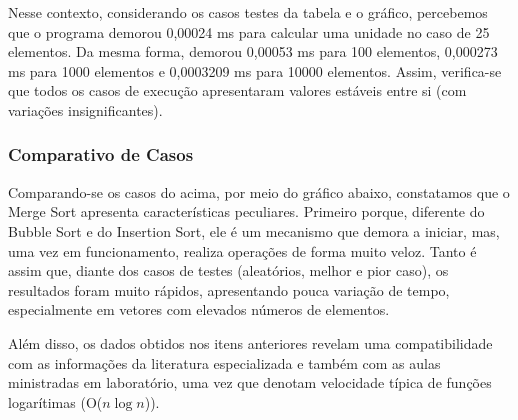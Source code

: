 \documentclass[a4paper, 12pt]{article}
\begin{document}
\vspace{0.8cm}
Nesse contexto, considerando os casos testes da tabela e o gráfico, percebemos que o programa demorou 0,00024 ms para calcular uma unidade no caso de 25 elementos. Da mesma forma, demorou 0,00053 ms para 100 elementos, 0,000273 ms para 1000 elementos e 0,0003209 ms para 10000 elementos. Assim, verifica-se que todos os casos de execução apresentaram valores estáveis entre si (com variações insignificantes).


\subsubsection{Comparativo de Casos}

\tab{ }Comparando-se os casos do acima, por meio do gráfico abaixo, constatamos que o Merge Sort apresenta características peculiares. Primeiro porque, diferente do Bubble Sort e do Insertion Sort, ele é um mecanismo que demora a iniciar, mas, uma vez em funcionamento, realiza operações de forma muito veloz. Tanto é assim que, diante dos casos de testes (aleatórios, melhor e pior caso), os resultados foram muito rápidos, apresentando pouca variação de tempo, especialmente em vetores com elevados números de elementos.

\begin{center}
\end{center}
\vspace{0.4cm}
\tab{ }Além disso, os dados obtidos nos itens anteriores revelam uma compatibilidade com as informações da literatura especializada e também com as aulas ministradas em laboratório, uma vez que denotam velocidade típica de funções logarítimas (O($n \log n$)).
\end{document}
